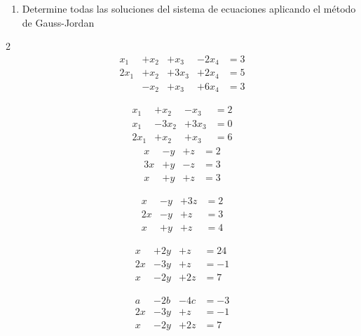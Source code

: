 \documentclass[
]{article}
\providecommand{\tightlist}{%
  \setlength{\itemsep}{0pt}\setlength{\parskip}{0pt}}
\begin{document}
\begin{enumerate}
\def\labelenumi{\arabic{enumi}.}
\setcounter{enumi}{7}
\tightlist
\item
  Determine todas las soluciones del sistema de ecuaciones aplicando el
  método de Gauss-Jordan
\end{enumerate}

\begin{multicols}{2}
\begin{equation}
  \begin{array}{cccc}
     x_1   & + x_2   & +x_3    & -2x_4    &= 3  \\
    2x_1   & + x_2   & +3x_3   & +2x_4    &= 5\\
           & - x_2   & +x_3    & +6x_4    &= 3
  \end{array}
\end{equation}\quad

\begin{equation}
  \begin{array}{cccc}
     x_1   & + x_2   & -x_3    &= 2  \\
     x_1   & -3 x_2   & +3x_3    & = 0\\
     2x_1   & + x_2   & +x_3    & = 6
  \end{array}
\end{equation}
\begin{equation}
  \begin{array}{cccc}
     x   & - y   & +z    & = 2  \\
     3x  & + y   & -z    & = 3\\
     x   & + y   & +z    & = 3
  \end{array}
\end{equation} \quad

\begin{equation}
  \begin{array}{cccc}
     x   & - y   & +3z    & = 2  \\
     2x  & - y   & +z    & = 3\\
     x   & + y   & +z    & = 4
  \end{array}
\end{equation}

\begin{equation}
  \begin{array}{cccc}
     x   & +2 y   & +z    & = 24  \\
     2x  & -3 y   & +z    & = -1  \\
     x   & -2 y   & +2z   & = 7
  \end{array}
\end{equation}

\begin{equation}
  \begin{array}{cccc}
     a   & -2 b   & -4c    & = -3  \\
     2x  & -3 y   & +z    & = -1  \\
     x   & -2 y   & +2z   & = 7
  \end{array}
\end{equation}
\end{multicols}
\end{document}
